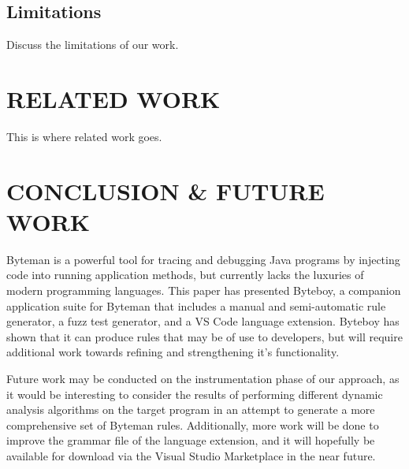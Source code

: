 \documentclass[letterpaper,twocolumn,10pt]{article}
\begin{document}
\subsection{Limitations}

Discuss the limitations of our work.

\section{RELATED WORK}

This is where related work goes. \\

\section{CONCLUSION \& FUTURE WORK}

Byteman is a powerful tool for tracing and debugging Java programs by injecting code into running application methods, but currently lacks the luxuries of modern programming languages. This paper has presented Byteboy, a companion application suite for Byteman that includes a manual and semi-automatic rule generator, a fuzz test generator, and a VS Code language extension. Byteboy has shown that it can produce rules that may be of use to developers, but will require additional work towards refining and strengthening it's functionality.

Future work may be conducted on the instrumentation phase of our approach, as it would be interesting to consider the results of performing different dynamic analysis algorithms on the target program in an attempt to generate a more comprehensive set of Byteman rules. Additionally, more work will be done to improve the grammar file of the language extension, and it will hopefully be available for download via the Visual Studio Marketplace in the near future.
\end{document}
